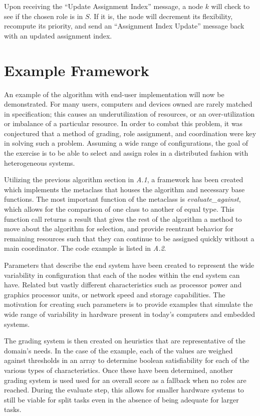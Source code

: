 \documentclass[11pt]{article}
\begin{document}
\begin{multicols}{2}
Upon receiving the ``Update Assignment Index'' message, a node $k$ will check to see if the chosen role is in $S$. If it is, the node will decrement its flexibility, recompute its priority, and send an ``Assignment Index Update'' message back with an updated assignment index.

\section{Example Framework}
An example of the algorithm with end-user implementation will now be demonstrated.  For many users, computers and devices owned are rarely matched in specification; this causes an underutilization of resources, or an over-utilization or imbalance of a particular resource.  In order to combat this problem, it was conjectured that a method of grading, role assignment, and coordination were key in solving such a problem.  Assuming a wide range of configurations, the goal of the exercise is to be able to select and assign roles in a distributed fashion with heterogeneous systems.

Utilizing the previous algorithm section in \textit{A.1}, a framework has been created which implements the metaclass that houses the algorithm and necessary base functions.  The most important function of the metaclass is \textit{evaluate\_against}, which allows for the comparison of one class to another of equal type.  This function call returns a result that gives the rest of the algorithm a method to move about the algorithm for selection, and provide reentrant behavior for remaining resources such that they can continue to be assigned quickly without a main coordinator.  The code example is listed in \textit{A.2}.

Parameters that describe the end system have been created to represent the wide variability in configuration that each of the nodes within the end system can have.  Related but vastly different characteristics such as processor power and graphics processor units, or network speed and storage capabilities.  The motivation for creating such parameters is to provide examples that simulate the wide range of variability in hardware present in today's computers and embedded systems.

The grading system is then created on heuristics that are representative of the domain's needs.  In the case of the example, each of the values are weighed against thresholds in an array to determine boolean satisfiability for each of the various types of characteristics.  Once these have been determined, another grading system is used used for an overall score as a fallback when no roles are reached.  During the evaluate step, this allows for smaller hardware systems to still be viable for split tasks even in the absence of being adequate for larger tasks.


\end{multicols}
\end{document}
